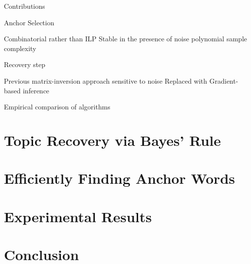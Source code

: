 \documentclass{lecture}
\begin{document}
\begin{plain}{Contributions}
\begin{enumerate}
	\p Anchor Selection
	\begin{itemize}
		\p Combinatorial rather than ILP
		\p Stable in the presence of noise
		\p polynomial sample complexity
	\end{itemize}
	
	\p Recovery step
	\begin{itemize}
		\p Previous matrix-inversion approach sensitive to noise
		\p Replaced with Gradient-based inference
	\end{itemize}
	
	\p Empirical comparison of algorithms
\end{enumerate}
\end{plain}

\section[Recovery]{Topic Recovery via Bayes' Rule}

\section[Anchor Words]{Efficiently Finding Anchor Words}

\section[Results]{Experimental Results}

\section[Conclusion]{Conclusion}
\end{document}
